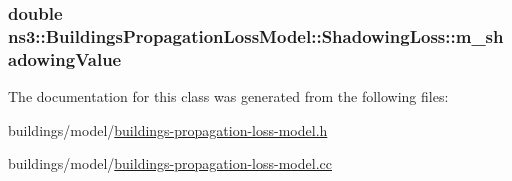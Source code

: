\subsubsection[{\texorpdfstring{m\+\_\+shadowing\+Value}{m_shadowingValue}}]{\setlength{\rightskip}{0pt plus 5cm}double ns3\+::\+Buildings\+Propagation\+Loss\+Model\+::\+Shadowing\+Loss\+::m\+\_\+shadowing\+Value\hspace{0.3cm}{\ttfamily [protected]}}\hypertarget{classns3_1_1BuildingsPropagationLossModel_1_1ShadowingLoss_a1f9344d38080c2f779aed244bc415171}{}\label{classns3_1_1BuildingsPropagationLossModel_1_1ShadowingLoss_a1f9344d38080c2f779aed244bc415171}


The documentation for this class was generated from the following files\+:\begin{DoxyCompactItemize}
\item 
buildings/model/\hyperlink{buildings-propagation-loss-model_8h}{buildings-\/propagation-\/loss-\/model.\+h}\item 
buildings/model/\hyperlink{buildings-propagation-loss-model_8cc}{buildings-\/propagation-\/loss-\/model.\+cc}\end{DoxyCompactItemize}
